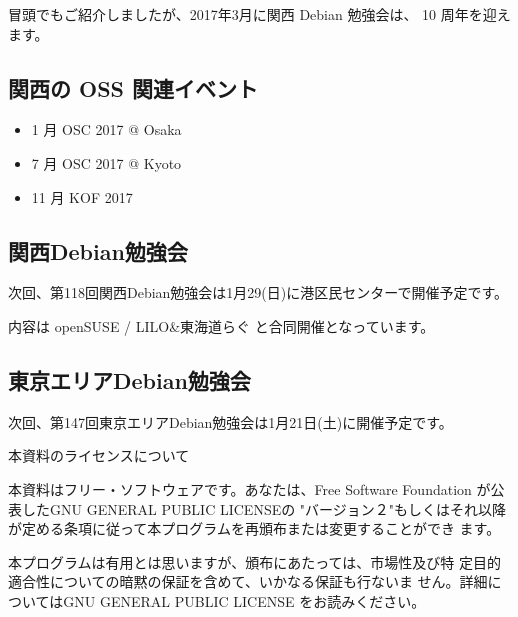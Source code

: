 \documentclass[mingoth,a4paper]{jsarticle}
\begin{document}
\clearpage


冒頭でもご紹介しましたが、2017年3月に関西 Debian 勉強会は、
10 周年を迎えます。

\subsection{関西の OSS 関連イベント}
\begin{itemize}
    \item 1 月 OSC 2017 @ Osaka
    \item 7 月 OSC 2017 @ Kyoto
    \item 11 月 KOF 2017
\end{itemize}

\subsection{関西Debian勉強会}
次回、第118回関西Debian勉強会は1月29(日)に港区民センターで開催予定です。

内容は openSUSE / LILO\&東海道らぐ と合同開催となっています。

\subsection{東京エリアDebian勉強会}
次回、第147回東京エリアDebian勉強会は1月21日(土)に開催予定です。


%
\mbox{}\newpage

\pagebreak

\begin{center}
本資料のライセンスについて
\end{center}

本資料はフリー・ソフトウェアです。あなたは、Free Software
Foundation が公表したGNU GENERAL PUBLIC LICENSEの "バージョン２"もしくはそれ以降
が定める条項に従って本プログラムを再頒布または変更することができ
ます。

本プログラムは有用とは思いますが、頒布にあたっては、市場性及び特
定目的適合性についての暗黙の保証を含めて、いかなる保証も行ないま
せん。詳細についてはGNU GENERAL PUBLIC LICENSE をお読みください。
\end{document}
